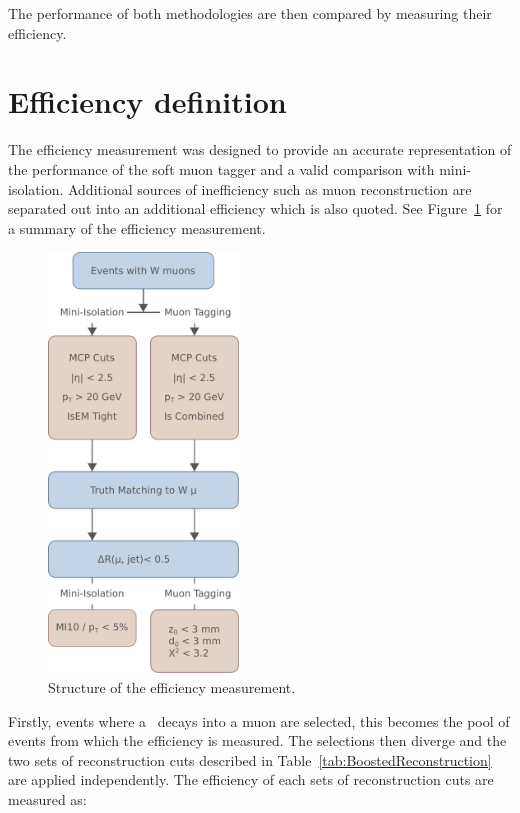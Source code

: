 The performance of both methodologies are then compared by measuring their efficiency.

\section{Efficiency definition} \label{sec:BoostedEfficiencyDefinition}

The efficiency measurement was designed to provide an accurate representation of the performance of the soft muon tagger and a valid comparison with mini-isolation. Additional sources of inefficiency such as muon reconstruction are separated out into an additional efficiency which is also quoted. See Figure~\ref{fig:BoostedFlowChart} for a summary of the efficiency measurement.

\begin{figure}[t]
  \centering
  \includegraphics[width=0.45\textwidth]{PartBoosted/Plots/FlowChart.pdf}
  \caption{Structure of the efficiency measurement.} \label{fig:BoostedFlowChart}
\end{figure}

Firstly, events where a \W\ decays into a muon are selected, this becomes the pool of events from which the efficiency is measured. The selections then diverge and the two sets of reconstruction cuts described in Table~\ref{tab:BoostedReconstruction} are applied independently. The efficiency of each sets of reconstruction cuts are measured as:

